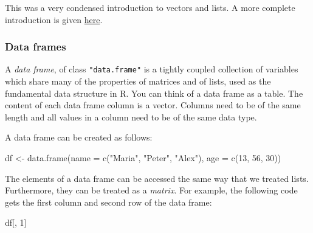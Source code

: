 \documentclass[
]{book}
\newenvironment{Shaded}{\begin{snugshade}}{\end{snugshade}}
\newcommand{\AttributeTok}[1]{\textcolor[rgb]{0.77,0.63,0.00}{#1}}
\newcommand{\DecValTok}[1]{\textcolor[rgb]{0.00,0.00,0.81}{#1}}
\newcommand{\FunctionTok}[1]{\textcolor[rgb]{0.00,0.00,0.00}{#1}}
\newcommand{\NormalTok}[1]{#1}
\newcommand{\OtherTok}[1]{\textcolor[rgb]{0.56,0.35,0.01}{#1}}
\newcommand{\SpecialCharTok}[1]{\textcolor[rgb]{0.00,0.00,0.00}{#1}}
\newcommand{\StringTok}[1]{\textcolor[rgb]{0.31,0.60,0.02}{#1}}
\begin{document}
\begin{Shaded}
\end{Shaded}

This was a very condensed introduction to vectors and lists. A more complete introduction is given \href{https://r4ds.had.co.nz/vectors.html}{here}.

\hypertarget{data-frames}{%
\subsubsection{Data frames}\label{data-frames}}

A \emph{data frame}, of class \texttt{"data.frame"} is a tightly coupled collection of variables which share many of the properties of matrices and of lists, used as the fundamental data structure in R. You can think of a data frame as a table. The content of each data frame column is a vector. Columns need to be of the same length and all values in a column need to be of the same data type.

A data frame can be created as follows:

\begin{Shaded}
\begin{Highlighting}[]
\NormalTok{df }\OtherTok{\textless{}{-}} \FunctionTok{data.frame}\NormalTok{(}\AttributeTok{name =} \FunctionTok{c}\NormalTok{(}\StringTok{"Maria"}\NormalTok{, }\StringTok{"Peter"}\NormalTok{, }\StringTok{"Alex"}\NormalTok{),}
                 \AttributeTok{age =} \FunctionTok{c}\NormalTok{(}\DecValTok{13}\NormalTok{, }\DecValTok{56}\NormalTok{, }\DecValTok{30}\NormalTok{))}
\end{Highlighting}
\end{Shaded}

The elements of a data frame can be accessed the same way that we treated lists. Furthermore, they can be treated as a \emph{matrix}. For example, the following code gets the first column and second row of the data frame:

\begin{Shaded}
\begin{Highlighting}[]
\NormalTok{df[, }\DecValTok{1}\NormalTok{]}
\end{Highlighting}
\end{Shaded}
\end{document}

